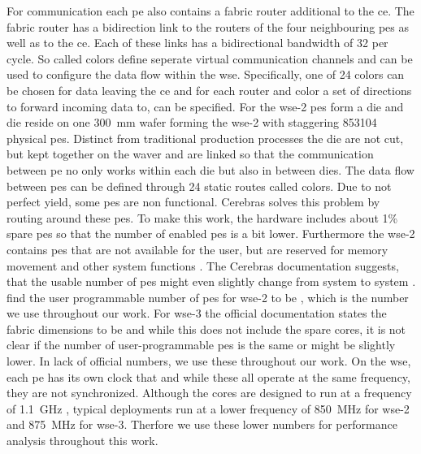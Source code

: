 For communication each \ac{pe} also contains a fabric router additional to the \ac{ce}. The fabric router has a bidirection link to the routers of the four neighbouring \acp{pe} as well as to the \ac{ce}. Each of these links has a bidirectional bandwidth of \qty{32}{\bit} per cycle. So called colors define seperate virtual communication channels and can be used to configure the data flow within the \ac{wse}. Specifically, one of 24 colors can be chosen for data leaving the \ac{ce} and for each router and color a set of directions to forward incoming data to, can be specified. For the \ac{wse}-2  \acp{pe} form a die and  die reside on one \qty{300}{\mm} wafer forming the \ac{wse}-2 with staggering \num{853104} physical \acp{pe}. Distinct from traditional production processes the die are not cut, but kept together on the waver and are linked so that the communication between \ac{pe} no only works within each die but also in between dies.
The data flow between \acp{pe} can be defined through 24 static routes called colors.\cite{lie2023cerebras}
Due to not perfect yield, some \acp{pe} are non functional.
Cerebras solves this problem by routing around these \acp{pe}. 
To make this work, the hardware includes about 1\% spare \acp{pe} so that the number of enabled \acp{pe} is a bit lower. Furthermore the \ac{wse}-2 contains \acp{pe} that are not available for the user, but are reserved for memory movement and other system functions \cite{tramm2024efficient}.
The Cerebras documentation suggests, that the usable number of \acp{pe} might even slightly change from system to system \cite{cerebras_gemv_tutorial}. \textcite{tramm2024efficient}\cite{tramm2024efficient} find the user programmable number of \acp{pe} for \ac{wse}-2 to be , which is the number we use throughout our work. For \ac{wse}-3 the official documentation states the fabric dimensions to be  and while this does not include the spare cores, it is not clear if the number of user-programmable \acp{pe} is the same or might be slightly lower. In lack of official numbers, we use these throughout our work. On the \ac{wse}, each \ac{pe} has its own clock that and while these all operate at the same frequency, they are not synchronized. Although the cores are designed to run at a frequency of \qty{1.1}{\giga\hertz} \cite{lie2023cerebras}, typical deployments run at a lower frequency of \qty{850}{\mega\hertz} for \ac{wse}-2 \cite{tramm2024efficient} and \qty{875}{\mega\hertz} for \ac{wse}-3. Therfore we use these lower numbers for performance analysis throughout this work.

